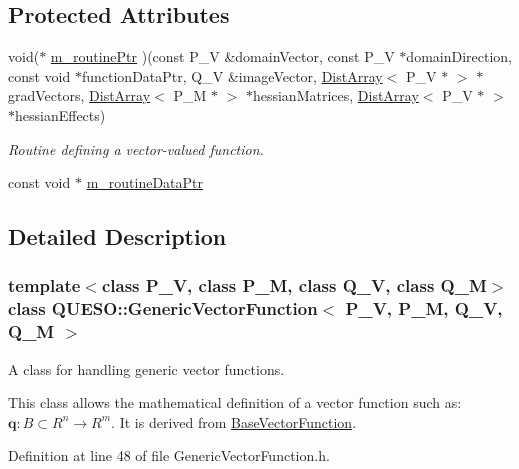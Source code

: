 \subsection*{Protected Attributes}
\begin{DoxyCompactItemize}
\item 
void($\ast$ \hyperlink{class_q_u_e_s_o_1_1_generic_vector_function_a1671b1c8c0d4eed14d203823af685a09}{m\-\_\-routine\-Ptr} )(const P\-\_\-\-V \&domain\-Vector, const P\-\_\-\-V $\ast$domain\-Direction, const void $\ast$function\-Data\-Ptr, Q\-\_\-\-V \&image\-Vector, \hyperlink{class_q_u_e_s_o_1_1_dist_array}{Dist\-Array}$<$ P\-\_\-\-V $\ast$ $>$ $\ast$grad\-Vectors, \hyperlink{class_q_u_e_s_o_1_1_dist_array}{Dist\-Array}$<$ P\-\_\-\-M $\ast$ $>$ $\ast$hessian\-Matrices, \hyperlink{class_q_u_e_s_o_1_1_dist_array}{Dist\-Array}$<$ P\-\_\-\-V $\ast$ $>$ $\ast$hessian\-Effects)
\begin{DoxyCompactList}\small\item\em Routine defining a vector-\/valued function. \end{DoxyCompactList}\item 
const void $\ast$ \hyperlink{class_q_u_e_s_o_1_1_generic_vector_function_a85df3216795107b164913ad339f0f813}{m\-\_\-routine\-Data\-Ptr}
\end{DoxyCompactItemize}


\subsection{Detailed Description}
\subsubsection*{template$<$class P\-\_\-\-V, class P\-\_\-\-M, class Q\-\_\-\-V, class Q\-\_\-\-M$>$class Q\-U\-E\-S\-O\-::\-Generic\-Vector\-Function$<$ P\-\_\-\-V, P\-\_\-\-M, Q\-\_\-\-V, Q\-\_\-\-M $>$}

A class for handling generic vector functions. 

This class allows the mathematical definition of a vector function such as\-: $ \mathbf{q}: B \subset R^n \rightarrow R^m $. It is derived from \hyperlink{class_q_u_e_s_o_1_1_base_vector_function}{Base\-Vector\-Function}. 

Definition at line 48 of file Generic\-Vector\-Function.\-h.



